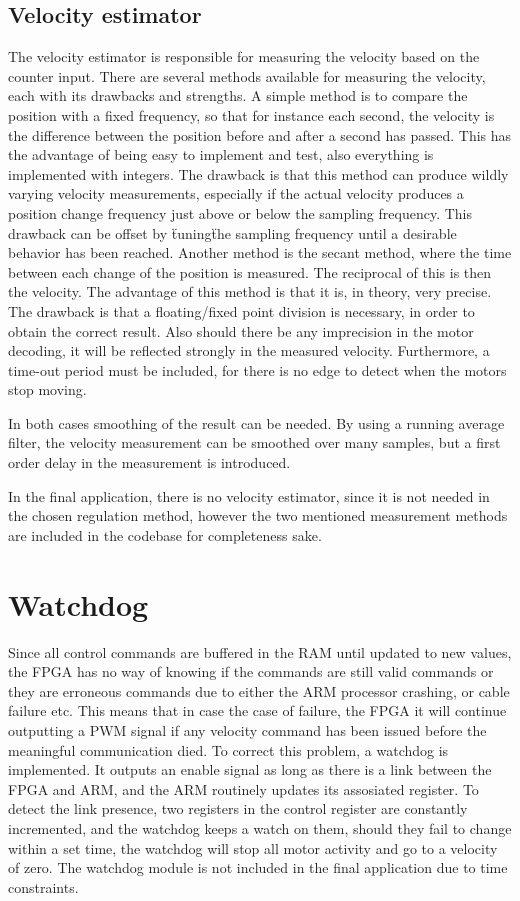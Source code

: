 \subsection{Velocity estimator}
The velocity estimator is responsible for measuring the velocity based on the counter input.
There are several methods available for measuring the velocity, each with its drawbacks and strengths.
A simple method is to compare the position with a fixed frequency, so that for instance each second, the velocity is the difference between the position before and after a second has passed. This has the advantage of being easy to implement and test, also everything is implemented with integers. The drawback is that this method can produce wildly varying velocity measurements, especially if the actual velocity produces a position change frequency just above or below the sampling frequency.
This drawback can be offset by \"tuning\" the sampling frequency until a desirable behavior has been reached.
Another method is the secant method, where the time between each change of the position is measured. The reciprocal of this is then the velocity. The advantage of this method is that it is, in theory, very precise. The drawback is that a floating/fixed point division is necessary, in order to obtain the correct result. Also should there be any imprecision in the motor decoding, it will be reflected strongly in the measured velocity. Furthermore, a time-out period must be included, for there is no edge to detect when the motors stop moving.

In both cases smoothing of the result can be needed. By using a running average filter, the velocity measurement can be smoothed over many samples, but a first order delay in the measurement is introduced.

In the final application, there is no velocity estimator, since it is not needed in the chosen regulation method, however the two mentioned measurement methods are included in the codebase for completeness sake.


\section{Watchdog}
Since all control commands are buffered in the RAM until updated to new values, the FPGA has no way of knowing if the commands are still valid commands or they are erroneous commands due to either the ARM processor crashing, or cable failure etc. This means that in case the case of failure, the FPGA it will continue outputting a PWM signal if any velocity command has been issued before the meaningful communication died. To correct this problem, a watchdog is implemented. It outputs an enable signal as long as there is a link between the FPGA and ARM, and the ARM routinely updates its assosiated register. 
To detect the link presence, two registers in the control register are constantly incremented, and the watchdog keeps a watch on them, should they fail to change within a set time, the watchdog will stop all motor activity and go to a velocity of zero.
The watchdog module is not included in the final application due to time constraints.
